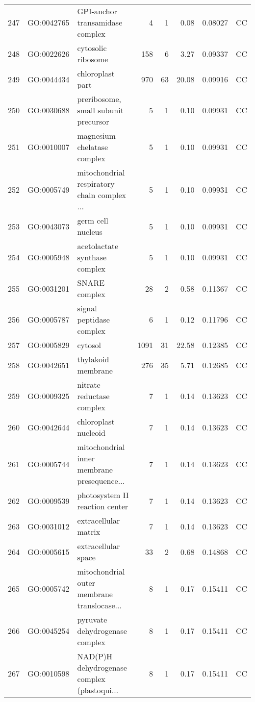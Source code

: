 \documentclass[12pt,oneside,a4paper]{article}
\begin{document}
\begin{longtable}{rllrrrll}
  247 & GO:0042765 & GPI-anchor transamidase complex &   4 &   1 & 0.08 & 0.08027 & CC \\ 
  248 & GO:0022626 & cytosolic ribosome & 158 &   6 & 3.27 & 0.09337 & CC \\ 
  249 & GO:0044434 & chloroplast part & 970 &  63 & 20.08 & 0.09916 & CC \\ 
  250 & GO:0030688 & preribosome, small subunit precursor &   5 &   1 & 0.10 & 0.09931 & CC \\ 
  251 & GO:0010007 & magnesium chelatase complex &   5 &   1 & 0.10 & 0.09931 & CC \\ 
  252 & GO:0005749 & mitochondrial respiratory chain complex ... &   5 &   1 & 0.10 & 0.09931 & CC \\ 
  253 & GO:0043073 & germ cell nucleus &   5 &   1 & 0.10 & 0.09931 & CC \\ 
  254 & GO:0005948 & acetolactate synthase complex &   5 &   1 & 0.10 & 0.09931 & CC \\ 
  255 & GO:0031201 & SNARE complex &  28 &   2 & 0.58 & 0.11367 & CC \\ 
  256 & GO:0005787 & signal peptidase complex &   6 &   1 & 0.12 & 0.11796 & CC \\ 
  257 & GO:0005829 & cytosol & 1091 &  31 & 22.58 & 0.12385 & CC \\ 
  258 & GO:0042651 & thylakoid membrane & 276 &  35 & 5.71 & 0.12685 & CC \\ 
  259 & GO:0009325 & nitrate reductase complex &   7 &   1 & 0.14 & 0.13623 & CC \\ 
  260 & GO:0042644 & chloroplast nucleoid &   7 &   1 & 0.14 & 0.13623 & CC \\ 
  261 & GO:0005744 & mitochondrial inner membrane presequence... &   7 &   1 & 0.14 & 0.13623 & CC \\ 
  262 & GO:0009539 & photosystem II reaction center &   7 &   1 & 0.14 & 0.13623 & CC \\ 
  263 & GO:0031012 & extracellular matrix &   7 &   1 & 0.14 & 0.13623 & CC \\ 
  264 & GO:0005615 & extracellular space &  33 &   2 & 0.68 & 0.14868 & CC \\ 
  265 & GO:0005742 & mitochondrial outer membrane translocase... &   8 &   1 & 0.17 & 0.15411 & CC \\ 
  266 & GO:0045254 & pyruvate dehydrogenase complex &   8 &   1 & 0.17 & 0.15411 & CC \\ 
  267 & GO:0010598 & NAD(P)H dehydrogenase complex (plastoqui... &   8 &   1 & 0.17 & 0.15411 & CC \\ 

\end{longtable}
\end{document}
